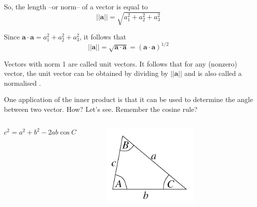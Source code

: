 \documentclass{beamer}
\begin{document}
\begin{frame}
So, the length --or norm-- of a vector  is equal to 
$$|| \mathbf{a}  ||  = \sqrt{a_{1}^{2} + a_{2}^{2} + a_{3}^{2}}$$ 

Since $\mathbf{a} \cdot \mathbf{a} = a_{1}^{2} + a_{2}^{2} + a_{3}^{2}$, it follows that $$|| \mathbf{a} || = \sqrt{ \mathbf{a} \cdot \mathbf{a} } = \left( \mathbf{a} \cdot \mathbf{a} \right)^{1/2}$$

Vectors with norm 1 are called unit vectors. It follows that for any (nonzero) vector, the unit vector can be obtained by dividing   by  $|| \mathbf{a} ||$ and is also called a normalised . \\[1cm]
\end{frame}

\begin{frame}

One application of the inner product is that it can be used to determine the angle between two vector. How? Let's see.
Remember the cosine rule? 
\begin{columns}[c]
$$ c^2 = a^2 + b^2 - 2ab\cos{C}$$


\begin{figure}[htbp]
\begin{center}
\includegraphics[width=0.8\textwidth]{abc.png}
\caption{}
\end{center}
\end{figure}
\end{columns}
\end{frame}
\end{document}
